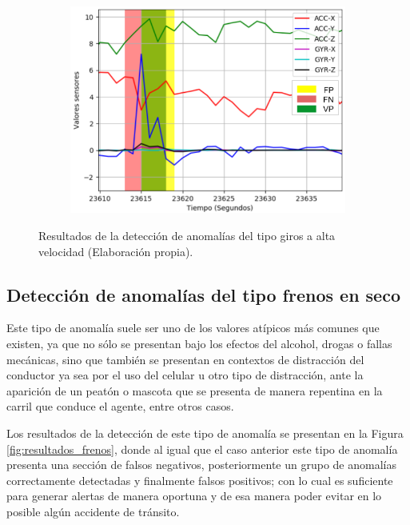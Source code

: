 \begin{figure}[H]
{\begin{varwidth}{\textwidth}
\begin{subfigure}[h]{0.45\textwidth}
            \includegraphics[width=\textwidth]{imagenes/Cap5/giro3}
        \end{subfigure} 
        \end{varwidth}}
        \caption{Resultados de la detecci\'{o}n de anomal\'{i}as del tipo giros a alta velocidad (Elaboraci\'{o}n propia).}
		\label{fig:resultados_giros}
    \end{figure}

\subsection{Detecci\'{o}n de anomal\'{i}as del tipo frenos en seco}

Este tipo de anomal\'{i}a suele ser uno de los valores at\'{i}picos m\'{a}s comunes que existen, ya que no s\'{o}lo se presentan bajo los efectos del alcohol, drogas o fallas mec\'{a}nicas, sino que tambi\'{e}n se presentan en contextos de distracci\'{o}n del conductor ya sea por el uso del celular u otro tipo de distracci\'{o}n, ante la aparici\'{o}n de un peat\'{o}n o mascota que se presenta de manera repentina en la carril que conduce el agente, entre otros casos.

\vspace{5mm} %

Los resultados de la detecci\'{o}n de este tipo de anomal\'{i}a se presentan en la Figura \ref{fig:resultados_frenos}, donde al igual que el caso anterior este tipo de anomal\'{i}a presenta una secci\'{o}n de falsos negativos, posteriormente un grupo de anomal\'{i}as correctamente detectadas y finalmente falsos positivos; con lo cual es suficiente para generar alertas de manera oportuna y de esa manera poder evitar en lo posible alg\'{u}n accidente de tr\'{a}nsito.

